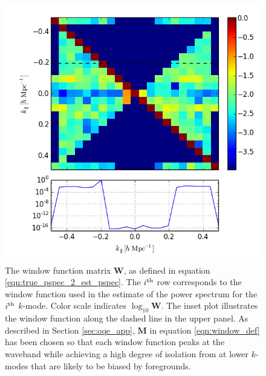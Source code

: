 \documentclass[twocolumn,numberedappendix]{emulateapj} \shorttitle{PSA64}
\begin{document}
\begin{figure}[t!]\centering
\includegraphics[width=\columnwidth]{plots/window.png}
\caption{
The window function matrix $\mathbf{W}$, as defined in equation \ref{eqn:true_pspec_2_est_pspec}.
The $i^{\rm th}$ row corresponds to the window function
used in the estimate of the power spectrum for the $i^{\rm th}$ $k$-mode.
Color scale indicates $\log_{10}\mathbf{W}$.
The inset plot illustrates the window function along the dashed line in the upper panel.
As described in Section \ref{sec:oqe_app}, $\mathbf{M}$ in equation \ref{eqn:window_def} has been chosen so that
each window function peaks at the waveband while achieving a high degree of isolation from
at lower $k$-modes that are likely to be biased by foregrounds.
}\label{fig:window_func}
\end{figure}
\end{document}
